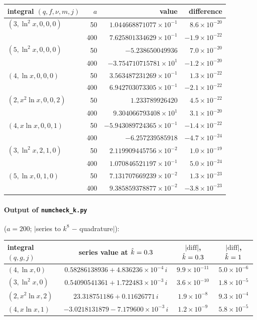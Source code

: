 {\small\renewcommand{\arraystretch}{1.3}
\begin{longtable}{@{}l r r r@{}}
\toprule
integral $(q,f,\nu,m,j)$ & $a$ & value & difference\\
\midrule
$(3,\ln^2x,0,0,0)$ & 50 & $1.044668871077\times10^{-1}$ & $8.6\times10^{-20}$\\
 & 400 & $7.625801334629\times10^{-1}$ & $-1.9\times10^{-22}$\\
$(5,\ln^2x,0,0,0)$ & 50 & $-5.238650049936$ & $7.0\times10^{-20}$\\
 & 400 & $-3.754710715781\times10^{1}$ & $-1.2\times10^{-20}$\\
$(4,\ln x,0,0,0)$ & 50 & $3.563487231269\times10^{-1}$ & $1.3\times10^{-22}$\\
 & 400 & $6.942703073305\times10^{-1}$ & $-2.1\times10^{-22}$\\
$(2,x^2\ln x,0,0,2)$ & 50 & $1.233789926420$ & $4.5\times10^{-22}$\\
 & 400 & $9.304066793408\times10^{1}$ & $3.1\times10^{-20}$\\
$(4,x\ln x,0,0,1)$ & 50 & $-5.943089724365\times10^{-1}$ & $-1.4\times10^{-22}$\\
 & 400 & $-6.257239585918$ & $-4.7\times10^{-24}$\\
$(3,\ln^2x,2,1,0)$ & 50 & $2.119909445756\times10^{-2}$ & $1.0\times10^{-19}$\\
 & 400 & $1.070846521197\times10^{-1}$ & $5.0\times10^{-24}$\\
$(5,\ln x,0,1,0)$ & 50 & $7.131707669239\times10^{-2}$ & $1.3\times10^{-23}$\\
 & 400 & $9.385859378877\times10^{-2}$ & $-3.8\times10^{-23}$\\
\bottomrule
\end{longtable}
}

\paragraph{Output of \texttt{numcheck\_k.py}} ($a=200$; $|$series to $k^8$ $-$ quadrature$|$):

{\small\renewcommand{\arraystretch}{1.3}
\begin{longtable}{@{}l c c c@{}}
\toprule
integral $(q,g,j)$ & series value at $\hat k=0.3$ & $|\text{diff}|$, $\hat k=0.3$ & $|\text{diff}|$, $\hat k=1$\\
\midrule
$(4,\ln x,0)$ & $0.58286138936+4.836236\times10^{-4}\,i$ & $9.9\times10^{-11}$ & $5.0\times10^{-6}$\\
$(3,\ln^2x,0)$ & $0.54090541361+1.722483\times10^{-3}\,i$ & $3.6\times10^{-10}$ & $1.8\times10^{-5}$\\
$(2,x^2\ln x,2)$ & $23.318751186+0.11626771\,i$ & $1.9\times10^{-8}$ & $9.3\times10^{-4}$\\
$(4,x\ln x,1)$ & $-3.0218131879-7.179600\times10^{-3}\,i$ & $1.2\times10^{-9}$ & $5.8\times10^{-5}$\\
\bottomrule
\end{longtable}
}

